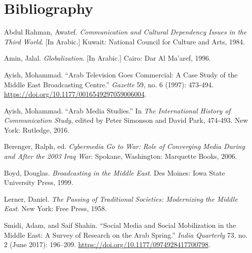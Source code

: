 \documentclass{tufte-handout}
\begin{document}
\section{Bibliography}\label{bibliography}

\begin{hangparas}{.25in}{1} 



Abdul Rahman, Awatef. \emph{Communication and Cultural Dependency Issues
in the Third World}. {[}In Arabic.{]} Kuwait: National Council for
Culture and Arts, 1984.

Amin, Jalal. \emph{Globalization}. {[}In Arabic.{]} Cairo: Dar Al
Ma'aref, 1996.

Ayish, Mohammad. ``Arab Television Goes Commercial: A Case Study of the
Middle East Broadcasting Centre.'' \emph{Gazette} 59, no. 6 (1997):
473-494. \url{https://doi.org/10.1177/0016549297059006004}.

Ayish, Mohammad. ``Arab Media Studies.'' In \emph{The International
History of Communication Study}, edited by Peter Simonson and David
Park, 474-493. New York: Rutledge, 2016.

Berenger, Ralph, ed. \emph{Cybermedia Go to War: Role of Converging
Media During and After the 2003 Iraq War}. Spokane, Washington:
Marquette Books, 2006.

Boyd, Douglas. \emph{Broadcasting in the Middle East}. Des Moines: Iowa
State University Press, 1999.

Lerner, Daniel. \emph{The Passing of Traditional Societies: Modernizing
the Middle East}. New York: Free Press, 1958.

Smidi, Adam, and Saif Shahin. ``Social Media and Social Mobilization in
the Middle East: A Survey of Research on the Arab Spring.'' \emph{India
Quarterly} 73, no. 2 (June 2017): 196--209.
\url{https://doi.org/10.1177/0974928417700798}.



\end{hangparas}
\end{document}

